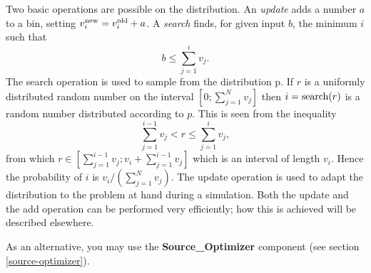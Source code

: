 Two basic operations are possible on the distribution. An \emph{update}
adds a number $a$ to a bin, setting $v_i^{\rm new} = v_i^{\rm old} +
a$. A \emph{search} finds, for given input $b$, the minimum $i$ such
that
\begin{equation}
 b \leq \sum_{j=1}^{i} v_j. 
\end{equation}
The search operation is used to sample from the distribution p. If $r$
is a uniformly distributed random number on the interval
$[0;\sum_{j=1}^N v_j]$ then $i = {\rm search}(r)$ is a random number
distributed according to $p$. This is seen from the inequality
\begin{equation} 
\sum_{j=1}^{i-1} v_j < r \leq \sum_{j=1}^{i} v_j, 
\end{equation}
from which $r \in [\sum_{j=1}^{i-1} v_j; v_i + \sum_{j=1}^{i-1} v_j]$
which is an interval of length $v_i$. Hence the probability of $i$ is
$v_i/(\sum_{j=1}^N v_j)$.
The update operation is used to
adapt the distribution to the problem at hand during a simulation. Both
the update and the add operation can be performed very efficiently; how
this is achieved will be described elsewhere.

As an alternative, you may use the {\bf Source\_Optimizer} component 
(see section \ref{source-optimizer}).

